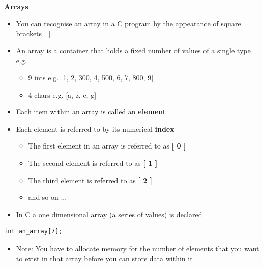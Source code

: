 \documentclass{beamer}
\begin{document}
\begin{frame} 
\begin{center}
\textbf{Arrays}
\end{center}
\begin{itemize}
\item You can recognise an array in a C program by the appearance of square brackets   [  ]
\item An array is a container that holds a fixed number of values of a single type e.g.
\begin{itemize}
\item 9 ints e.g. [1, 2, 300, 4, 500, 6, 7, 800, 9]
\item 4 chars e.g. [a, z, e, g]
\end{itemize}
\end{itemize}
 \end{frame}
 
 \begin{frame} 
\begin{itemize}
\item Each item within an array is called an \textbf{element }
\item Each element is referred to by its numerical \textbf{index}
\begin{itemize}
\item The first element in an array is referred to as \textbf{[ 0 ]}
\item The second element is referred to as \textbf{[ 1 ]}
\item The third element is referred to as \textbf{[ 2 ]}
\item and so on ...
\end{itemize}
\end{itemize}
 \end{frame}

\begin{frame}[fragile]
\begin{itemize}
\item In C a one dimensional array (a series of values) is declared
\end{itemize}

\begin{block}{}
\begin{lstlisting}
int an_array[7];
\end{lstlisting}
\end{block}

\begin{itemize}
\item Note: You have to allocate memory for the number of elements that you want to exist in that array before you can store data within it
\end{itemize}
\end{frame}
\end{document}
